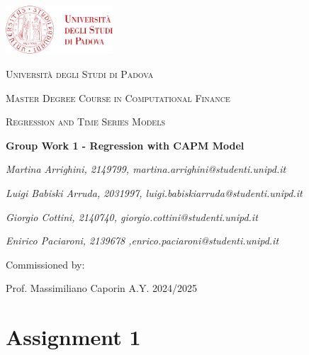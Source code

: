 \documentclass[12pt, openright, twoside]{report}
\begin{document}

    \begin{titlepage}
        \centering
        \includegraphics[width=0.3\textwidth]{figures/logo_unipd.png}\par\vspace{1cm}
        {\scshape\LARGE Università degli Studi di Padova \par}
        \vspace{1.5cm}
        {\scshape\Large Master Degree Course in Computational Finance \par}
        \vspace{.2cm}
        {\scshape\large Regression and Time Series Models \par}
        \vspace{1.5cm}
        {\Large\bfseries Group Work 1 - Regression with CAPM Model\par}
        \vspace{1.5cm}
        {\itshape Martina Arrighini, 2149799, martina.arrighini@studenti.unipd.it \par}
        {\itshape Luigi Babiski Arruda, 2031997, luigi.babiskiarruda@studenti.unipd.it\par}
        {\itshape Giorgio Cottini, 2140740, giorgio.cottini@studenti.unipd.it \par}
        {\itshape Enirico Paciaroni, 2139678 ,enrico.paciaroni@studenti.unipd.it \par}
        \vfill
        Commissioned by: \par
        Prof. Massimiliano Caporin
        \vfill
        {\large A.Y. 2024/2025}
    \end{titlepage}

\setcounter{page}{1}

\section*{Assignment 1}
\end{document}
